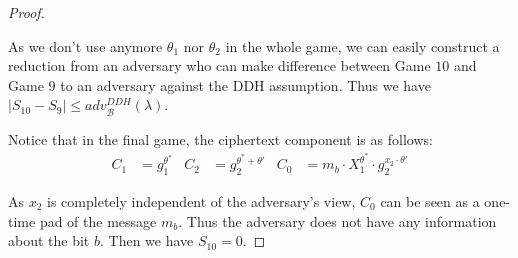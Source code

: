 \begin{proof}
\begin{description}
    As we don't use anymore $\theta_1$ nor $\theta_2$ in the whole game, we can easily construct a reduction from an adversary who can make difference between \textsf{Game} $10$ and \textsf{Game} $9$ to an adversary against the DDH assumption. Thus we have $|S_{10} - S_9| \leq adv_{\mathcal{B}}^{DDH}(\lambda)$.
    
  \end{description}

  Notice that in the final game, the ciphertext component is as follows:
  \begin{align*}
    C_1 &= g_1^{\theta^*} & C_2 &= g_2^{\theta^*+ \theta'} & C_0 &= m_b \cdot X_1^{\theta^*} \cdot g_2^{x_2 \cdot \theta'}
  \end{align*}

  As $x_2$ is completely independent of the adversary's view, $C_0$ can be seen as a one-time pad of the message $m_b$. Thus the adversary does not have any information about the bit $b$. Then we have $S_{10} = 0$.

\end{proof}
